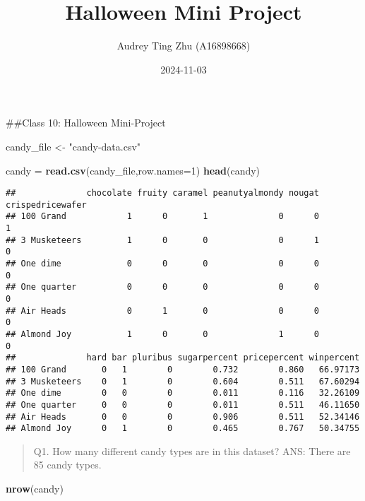 \documentclass[
]{article}
\title{Halloween Mini Project}
\author{Audrey Ting Zhu (A16898668)}
\date{2024-11-03}
\newenvironment{Shaded}{\begin{snugshade}}{\end{snugshade}}
\newcommand{\AttributeTok}[1]{\textcolor[rgb]{0.13,0.29,0.53}{#1}}
\newcommand{\DecValTok}[1]{\textcolor[rgb]{0.00,0.00,0.81}{#1}}
\newcommand{\FunctionTok}[1]{\textcolor[rgb]{0.13,0.29,0.53}{\textbf{#1}}}
\newcommand{\NormalTok}[1]{#1}
\newcommand{\OtherTok}[1]{\textcolor[rgb]{0.56,0.35,0.01}{#1}}
\newcommand{\StringTok}[1]{\textcolor[rgb]{0.31,0.60,0.02}{#1}}
\begin{document}
\maketitle

\#\#Class 10: Halloween Mini-Project

\begin{Shaded}
\begin{Highlighting}[]
\NormalTok{candy\_file }\OtherTok{\textless{}{-}} \StringTok{"candy{-}data.csv"}

\NormalTok{candy }\OtherTok{=} \FunctionTok{read.csv}\NormalTok{(candy\_file,}\AttributeTok{row.names=}\DecValTok{1}\NormalTok{)}
\FunctionTok{head}\NormalTok{(candy)}
\end{Highlighting}
\end{Shaded}

\begin{verbatim}
##              chocolate fruity caramel peanutyalmondy nougat crispedricewafer
## 100 Grand            1      0       1              0      0                1
## 3 Musketeers         1      0       0              0      1                0
## One dime             0      0       0              0      0                0
## One quarter          0      0       0              0      0                0
## Air Heads            0      1       0              0      0                0
## Almond Joy           1      0       0              1      0                0
##              hard bar pluribus sugarpercent pricepercent winpercent
## 100 Grand       0   1        0        0.732        0.860   66.97173
## 3 Musketeers    0   1        0        0.604        0.511   67.60294
## One dime        0   0        0        0.011        0.116   32.26109
## One quarter     0   0        0        0.011        0.511   46.11650
## Air Heads       0   0        0        0.906        0.511   52.34146
## Almond Joy      0   1        0        0.465        0.767   50.34755
\end{verbatim}

\begin{quote}
Q1. How many different candy types are in this dataset? ANS: There are
85 candy types.
\end{quote}

\begin{Shaded}
\begin{Highlighting}[]
\FunctionTok{nrow}\NormalTok{(candy)}
\end{Highlighting}
\end{Shaded}
\end{document}
